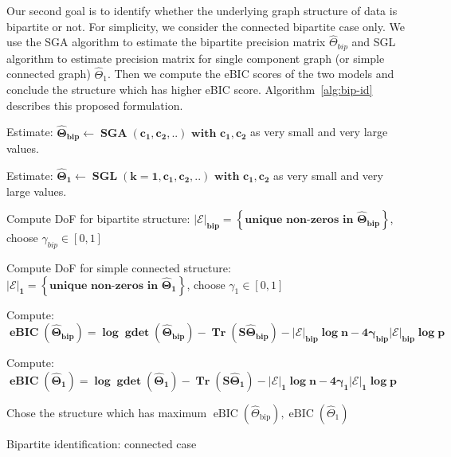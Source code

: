 Our second goal is to identify whether the underlying graph structure of data is bipartite or not. For simplicity, we consider the connected bipartite case only. We use the SGA algorithm to estimate the bipartite precision matrix $\hat{\Theta}_{bip}$ and SGL algorithm to estimate precision matrix for single component graph (or simple connected graph) $\hat{\Theta}_{1}$.  Then we compute the eBIC scores of the two models and conclude the structure which has higher eBIC score. Algorithm~\ref{alg:bip-id} describes this proposed formulation.

\begin{algorithm}[ht]
	Estimate: $\mathbf{\hat{\Theta}_{bip} \leftarrow \operatorname{SGA}\left(c_{1}, c_{2}, . .\right) \text{ with } c_{1}, c_{2}}$ as very small and very large values.
	
	Estimate: $\mathbf{\hat{\Theta}_{1} \leftarrow \operatorname{SGL}\left(k=1, c_{1}, c_{2}, . .\right) \text{ with } c_{1}, c_{2}}$ as very small and very large values.
	
	Compute DoF for bipartite structure: $\mathbf{|\mathcal{E}|_{bip} = \left\{ \text{unique non-zeros in } \hat{\Theta}_{bip} \right\} } $, choose $\gamma_{bip} \in[0,1]$ 
	
	Compute DoF for simple connected structure: $\mathbf{|\mathcal{E}|_{1} = \left\{ \text{unique non-zeros in } \hat{\Theta}_{1} \right\}   } $, choose $\gamma_{1} \in[0,1]$ 
	
	Compute: $\mathbf{\operatorname{eBIC}\left(\hat{\Theta}_{bip}\right)=\log \operatorname{gdet}\left(\hat{\Theta}_{bip}\right)-\operatorname{Tr}\left(S \hat{\Theta}_{bip}\right)-|\mathcal{E}|_{bip} \log n-4 \gamma_{bip} |\mathcal{E}|_{bip} \log p}$ 
	
	Compute: $\mathbf{\operatorname{eBIC}\left(\hat{\Theta}_{1}\right)=\log \operatorname{gdet}\left(\hat{\Theta}_{1}\right)-\operatorname{Tr}\left(S \hat{\Theta}_{1}\right)-|\mathcal{E}|_{1} \log n-4 \gamma_{1} |\mathcal{E}|_{1} \log p}$ 		
	
	Chose the structure which has maximum $\operatorname{eBIC}\left(\hat{\Theta}_{\mathrm{bip}}\right), \operatorname{eBIC}(\hat{\Theta}_{1})$
	
	\caption{Bipartite identification: connected case}
	\label{alg:bip-id}
\end{algorithm}


